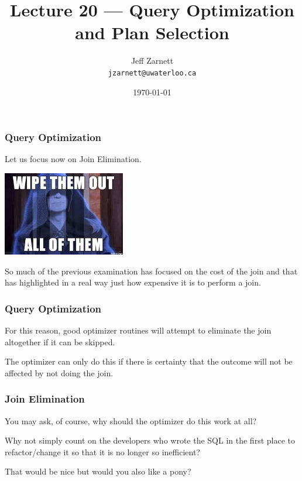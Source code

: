 

\title{Lecture 20 --- Query Optimization and Plan Selection}

\author{Jeff Zarnett \\ \small \texttt{jzarnett@uwaterloo.ca}}
\date{\today}




\begin{frame}
  \titlepage

 \end{frame}

\begin{frame}
\frametitle{Query Optimization}

Let us focus now on \alert{Join Elimination}.

\begin{center}
	\includegraphics[width=0.4\textwidth]{images/joinelim.jpg}
\end{center}

So much of the previous examination has focused on the cost of the join and that has highlighted in a real way just how expensive it is to perform a join. 

 \end{frame}

\begin{frame}
\frametitle{Query Optimization}

For this reason, good optimizer routines will attempt to eliminate the join altogether if it can be skipped. 

The optimizer can only do this if there is certainty that the outcome will not be affected by not doing the join. 


\end{frame}

\begin{frame}
\frametitle{Join Elimination}

You may ask, of course, why should the optimizer do this work at all? 

Why not simply count on the developers who wrote the SQL in the first place to refactor/change it so that it is no longer so inefficient? 

That would be nice but would you also like a pony? 

\end{frame}

